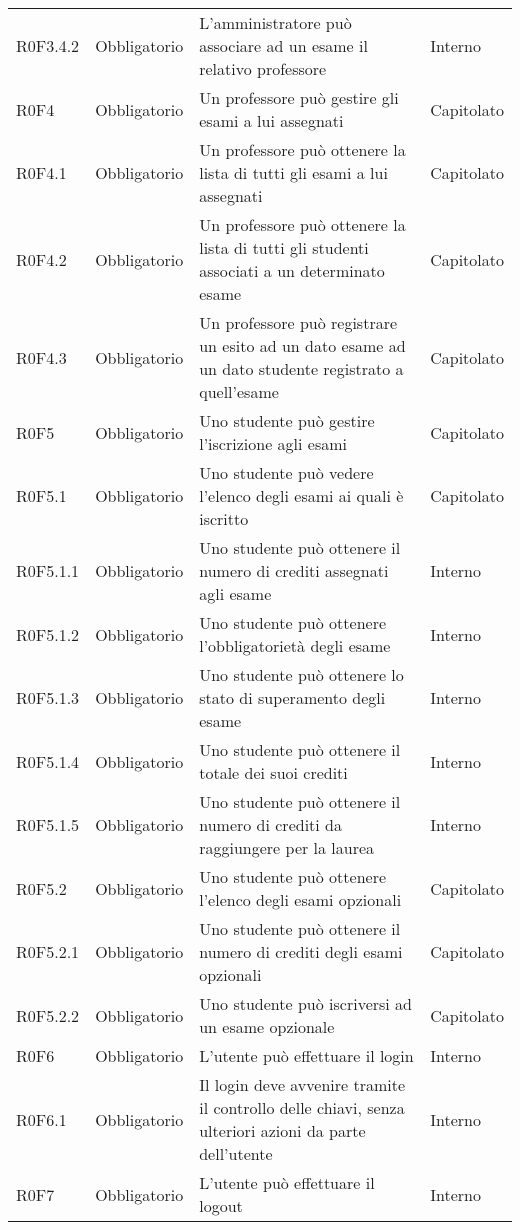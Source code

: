 \documentclass[AnalisiDeiRequisiti.tex]{subfiles}
\begin{document}
\begin{longtable}[H]{p{2.6cm}p{2.5cm}p{5cm}p{2cm}}
	R0F3.4.2  & Obbligatorio & L'amministratore può associare ad un esame il relativo professore & Interno \\  
	R0F4 & Obbligatorio & Un professore può gestire gli esami a lui assegnati & Capitolato \\  
	R0F4.1 & Obbligatorio & Un professore può ottenere la lista di tutti gli esami a lui assegnati & Capitolato \\  
	R0F4.2 & Obbligatorio & Un professore può ottenere la lista di tutti gli studenti associati a un determinato esame & Capitolato \\  
	R0F4.3 & Obbligatorio & Un professore può registrare un esito ad un dato esame ad un dato studente registrato a quell'esame & Capitolato \\  
	R0F5 & Obbligatorio & Uno studente può gestire l'iscrizione agli esami & Capitolato \\  
	R0F5.1 & Obbligatorio & Uno studente può vedere l'elenco degli esami ai quali è iscritto & Capitolato \\  
	R0F5.1.1 & Obbligatorio & Uno studente può ottenere il numero di crediti assegnati agli esame & Interno \\  
	R0F5.1.2 & Obbligatorio & Uno studente può ottenere l'obbligatorietà degli esame & Interno \\  
	R0F5.1.3 & Obbligatorio & Uno studente può ottenere lo stato di superamento degli esame & Interno \\  
	R0F5.1.4 & Obbligatorio & Uno studente può ottenere il totale dei suoi crediti & Interno \\  
	R0F5.1.5 & Obbligatorio & Uno studente può ottenere il numero di crediti da raggiungere per la laurea & Interno \\  
	R0F5.2 & Obbligatorio & Uno studente può ottenere l'elenco degli esami opzionali & Capitolato \\  
	R0F5.2.1 & Obbligatorio & Uno studente può ottenere il numero di crediti degli esami opzionali & Capitolato \\  
	R0F5.2.2 & Obbligatorio & Uno studente può iscriversi ad un esame opzionale & Capitolato \\  
	R0F6 & Obbligatorio & L'utente può effettuare il login & Interno \\  
	R0F6.1 & Obbligatorio & Il login deve avvenire tramite il controllo delle chiavi, senza ulteriori azioni da parte dell'utente & Interno \\  
	R0F7 & Obbligatorio & L'utente può effettuare il logout & Interno \\  

\end{longtable}
\end{document}
